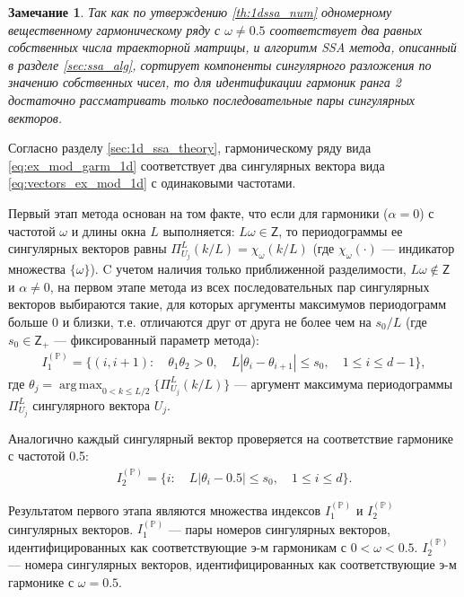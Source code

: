 \documentclass[specialist,
               substylefile = spbu.rtx,
               subf,href,colorlinks=true, 12pt]{disser}
\def\argmax{\mathop{\mathrm{argmax}}}
\def\argmax{\mathop{\mathrm{arg\,max}}}
\newtheorem{remark}{Замечание}
\begin{document}
\begin{remark}
Так как по утверждению \ref{th:1dssa_num} одномерному вещественному гармоническому ряду с $\omega \not = 0.5$ соответствует два равных собственных числа траекторной матрицы, и алгоритм SSA метода, описанный в разделе \ref{sec:ssa_alg}, сортирует компоненты сингулярного разложения по значению собственных чисел, то
для идентификации гармоник ранга 2 достаточно рассматривать только последовательные пары сингулярных векторов.
\end{remark}

Согласно разделу \ref{sec:1d_ssa_theory}, гармоническому ряду вида \eqref{eq:ex_mod_garm_1d} соответствует два сингулярных вектора вида \eqref{eq:vectors_ex_mod_1d} с одинаковыми частотами.

Первый этап метода основан на том факте, что если для гармоники ($\alpha = 0$) с частотой $\omega$ и длины окна $L$ выполняется: $L \omega \in \mathsf{Z}$, то периодограммы ее сингулярных векторов равны $\Pi_{U_j}^L(k/L)=\chi_{\omega}(k/L)$ (где $\chi_{\omega}(\cdot)$ --- индикатор множества $\{\omega\}$).
C учетом наличия только приближенной разделимости, $L\omega \not \in \mathsf{Z}$ и $\alpha \not = 0$,
на первом этапе метода из всех последовательных пар сингулярных векторов выбираются такие, для которых аргументы максимумов периодограмм больше 0 и близки, т.е. отличаются друг от друга не более чем на $s_0/L$ (где $s_0 \in \mathsf{Z}_+$ --- фиксированный параметр метода):
\begin{gather} \label{eq:I_1_P}
I_1^{(\mathbb{P})} = \{ (i, i+1): \quad \theta_1 \theta_2 >0, \quad L |\theta_i - \theta_{i+1}| \leqslant s_0, \quad 1 \leqslant i \leqslant d -1  \},
\end{gather}
где $\theta_j = \argmax_{0 < k \leqslant L/2} \{\Pi_{U_j}^L(k/L)\}$ --- аргумент максимума периодограммы $\Pi_{U_j}^{L}$ сингулярного вектора $U_j$.

Аналогично каждый сингулярный вектор проверяется на соответствие гармонике с частотой 0.5:
\begin{gather} \label{eq:I_2_P}
I_2^{(\mathbb{P})} = \{i: \quad  L |\theta_{i} - 0.5 | \leqslant s_0, \quad 1 \leqslant i \leqslant d\}.
\end{gather}

Результатом первого этапа являются множества индексов $I_1^{(\mathbb{P})}$ и $I_2^{(\mathbb{P})}$ сингулярных векторов. $I_1^{(\mathbb{P})}$ --- пары номеров сингулярных векторов, идентифицированных как соответствующие э-м гармоникам с $0 < \omega < 0.5$.  $I_2^{(\mathbb{P})}$ --- номера сингулярных векторов, идентифицированных как соответствующие э-м гармонике с $\omega = 0.5$.
\end{document}
